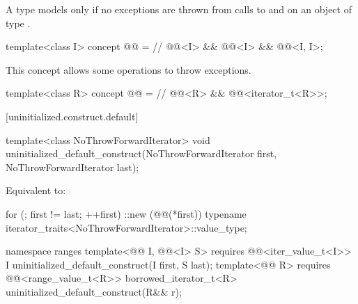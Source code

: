 \begin{itemdescr}
\pnum
A type  models  only if
no exceptions are thrown from calls to  and
 on an object of type .
\end{itemdescr}

\begin{itemdecl}
template<class I>
concept @@ = // \expos
  @@<I> &&
  @@<I> &&
  @@<I, I>;
\end{itemdecl}

\begin{itemdescr}
\pnum
\begin{note}
This concept allows some 
operations to throw exceptions.
\end{note}
\end{itemdescr}

\begin{itemdecl}
template<class R>
concept @@ = // \expos
  @@<R> &&
  @@<iterator_t<R>>;
\end{itemdecl}

[uninitialized.construct.default]{}

%
\begin{itemdecl}
template<class NoThrowForwardIterator>
  void uninitialized_default_construct(NoThrowForwardIterator first, NoThrowForwardIterator last);
\end{itemdecl}

\begin{itemdescr}
\pnum
\effects
Equivalent to:
\begin{codeblock}
for (; first != last; ++first)
  ::new (@@(*first))
    typename iterator_traits<NoThrowForwardIterator>::value_type;
\end{codeblock}
\end{itemdescr}

%
\begin{itemdecl}
namespace ranges {
  template<@@ I, @@<I> S>
    requires @@<iter_value_t<I>>
    I uninitialized_default_construct(I first, S last);
  template<@@ R>
    requires @@<range_value_t<R>>
    borrowed_iterator_t<R> uninitialized_default_construct(R&& r);
}
\end{itemdecl}

